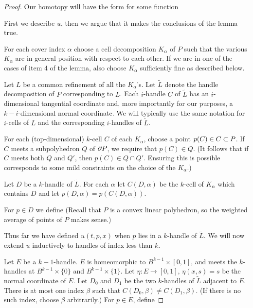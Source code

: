 \begin{proof}
Our homotopy will have the form
for some function

First we describe $u$, then we argue that it makes the conclusions of the lemma true.

For each cover index $\alpha$ choose a cell decomposition $K_\alpha$ of $P$
such that the various $K_\alpha$ are in general position with respect to each other.
If we are in one of the cases of item 4 of the lemma, also choose $K_\alpha$
sufficiently fine as described below.

\def\jj{\tilde{L}}
Let $L$ be a common refinement of all the $K_\alpha$'s.
Let $\jj$ denote the handle decomposition of $P$ corresponding to $L$.
Each $i$-handle $C$ of $\jj$ has an $i$-dimensional tangential coordinate and,
more importantly for our purposes, a $k{-}i$-dimensional normal coordinate.
We will typically use the same notation for $i$-cells of $L$ and the 
corresponding $i$-handles of $\jj$.

For each (top-dimensional) $k$-cell $C$ of each $K_\alpha$, choose a point $p(C) \in C \subset P$.
If $C$ meets a subpolyhedron $Q$ of $\partial P$, we require that $p(C)\in Q$.
(It follows that if $C$ meets both $Q$ and $Q'$, then $p(C)\in Q\cap Q'$.
Ensuring this is possible corresponds to some mild constraints on the choice of the $K_\alpha$.)

Let $D$ be a $k$-handle of $\jj$.
For each $\alpha$ let $C(D, \alpha)$ be the $k$-cell of $K_\alpha$ which contains $D$
and let $p(D, \alpha) = p(C(D, \alpha))$.

For $p \in D$ we define
(Recall that $P$ is a convex linear polyhedron, so the weighted average of points of $P$
makes sense.)

Thus far we have defined $u(t, p, x)$ when $p$ lies in a $k$-handle of $\jj$.
We will now extend $u$ inductively to handles of index less than $k$.

Let $E$ be a $k{-}1$-handle.
$E$ is homeomorphic to $B^{k-1}\times [0,1]$, and meets
the $k$-handles at $B^{k-1}\times\{0\}$ and $B^{k-1}\times\{1\}$.
Let $\eta : E \to [0,1]$, $\eta(x, s) = s$ be the normal coordinate
of $E$.
Let $D_0$ and $D_1$ be the two $k$-handles of $\jj$ adjacent to $E$.
There is at most one index $\beta$ such that $C(D_0, \beta) \ne C(D_1, \beta)$.
(If there is no such index, choose $\beta$
arbitrarily.)
For $p \in E$, define



\end{proof}
